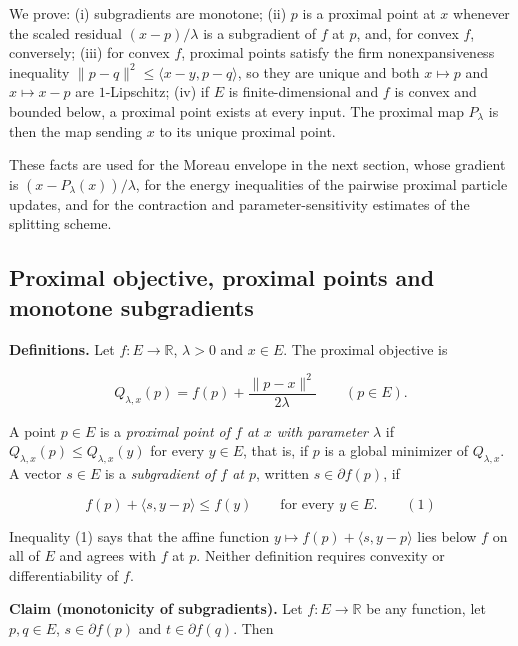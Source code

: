 \documentclass[11pt,a4paper]{report}
\begin{document}
We prove: (i) subgradients are monotone; (ii) \(p\) is a proximal point at \(x\) whenever the scaled residual \((x-p)/\lambda\) is a subgradient of \(f\) at \(p\), and, for convex \(f\), conversely; (iii) for convex \(f\), proximal points satisfy the firm nonexpansiveness inequality \(\|p-q\|^2\le\langle x-y,p-q\rangle\), so they are unique and both \(x\mapsto p\) and \(x\mapsto x-p\) are \(1\)-Lipschitz; (iv) if \(E\) is finite-dimensional and \(f\) is convex and bounded below, a proximal point exists at every input. The proximal map \(P_\lambda\) is then the map sending \(x\) to its unique proximal point.




These facts are used for the Moreau envelope in the next section, whose gradient is \((x-P_\lambda(x))/\lambda\), for the energy inequalities of the pairwise proximal particle updates, and for the contraction and parameter-sensitivity estimates of the splitting scheme.

\subsection{\texorpdfstring{Proximal objective, proximal points and monotone subgradients}{Proximal objective, proximal points and monotone subgradients}}
\label{report-step-ProximalLangevin-Proximal-lean-1}


\textbf{Definitions.} Let \(f:E\to\mathbb R\), \(\lambda>0\) and \(x\in E\). The proximal objective is


\[Q_{\lambda,x}(p)=f(p)+\frac{\|p-x\|^2}{2\lambda}\qquad(p\in E).\]


A point \(p\in E\) is a \emph{proximal point of \(f\) at \(x\) with parameter \(\lambda\)} if \(Q_{\lambda,x}(p)\le Q_{\lambda,x}(y)\) for every \(y\in E\), that is, if \(p\) is a global minimizer of \(Q_{\lambda,x}\). A vector \(s\in E\) is a \emph{subgradient of \(f\) at \(p\)}, written \(s\in\partial f(p)\), if


\[f(p)+\langle s,y-p\rangle\le f(y)\qquad\text{for every }y\in E.\qquad(1)\]


Inequality (1) says that the affine function \(y\mapsto f(p)+\langle s,y-p\rangle\) lies below \(f\) on all of \(E\) and agrees with \(f\) at \(p\). Neither definition requires convexity or differentiability of \(f\).




\textbf{Claim (monotonicity of subgradients).} Let \(f:E\to\mathbb R\) be any function, let \(p,q\in E\), \(s\in\partial f(p)\) and \(t\in\partial f(q)\). Then
\end{document}
